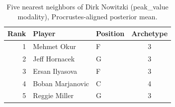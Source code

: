 \begin{table}[htbp]
  \centering\small
  \begin{tabular}{rllc}
    \toprule
    Rank & Player & Position & Archetype \\
    \midrule
    1 & Mehmet Okur & F & 3 \\
    2 & Jeff Hornacek & G & 3 \\
    3 & Ersan Ilyasova & F & 3 \\
    4 & Boban Marjanovic & C & 4 \\
    5 & Reggie Miller & G & 3 \\
    \bottomrule
  \end{tabular}
  \caption{Five nearest neighbors of Dirk Nowitzki (peak_value modality), Procrustes-aligned posterior mean.}
  \label{tab:Dirk_Nowitzki_neighbors_peak_value}
\end{table}

